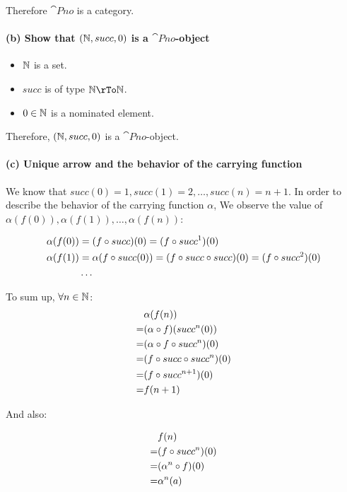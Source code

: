 \documentclass[11pt]{article}
\begin{document}
Therefore $\cat{Pno}$ is a category.

\paragraph{(b) Show that $(\mathbb{N}, succ, 0)$ is a $\cat{Pno}$-object}

\begin{itemize}
  \item $\mathbb{N}$ is a set.
  \item $succ$ is of type $\nat \rTo \nat$.
  \item $0 \in \mathbb{N}$ is a nominated element.
\end{itemize}

Therefore, $(\mathbb{N}, succ, 0)$ is a $\cat{Pno}$-object.

\paragraph{(c) Unique arrow and the behavior of the carrying function}\mbox{}

We know that $succ(0) = 1, succ(1) = 2, \ldots, succ(n) = n + 1$.
In order to describe the behavior of the carrying function $\alpha$,
We observe the value of $\alpha(f(0)), \alpha(f(1)), \ldots, \alpha(f(n))$:

\begin{align*}
\alpha(f(0)) & = (f \circ succ)(0) = (f \circ succ^1)(0) \\
\alpha(f(1)) & = \alpha(f \circ succ (0)) = (f \circ succ \circ succ)(0)
= (f \circ succ^2)(0) \\
& \ldots
\end{align*}

To sum up, $\forall n \in \mathbb{N}$:
\begin{align*}
& \alpha(f(n)) \\
= &(\alpha \circ f)(succ^n(0)) \\
= &(\alpha \circ f \circ succ^n) (0) \\
= &(f \circ succ \circ succ^n) (0) \\
= &(f \circ succ^{n+1})(0) \\
= &f(n+1)
\end{align*}

And also:

\begin{align*}
& f(n) \\
= & (f \circ succ^{n})(0) \\
= & (\alpha^n \circ f)(0) \\
= & \alpha^n(a)
\end{align*}
\end{document}
